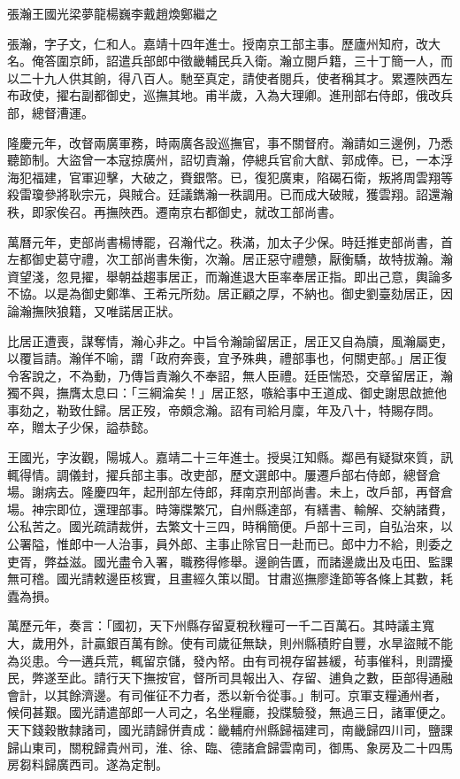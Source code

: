 
\begin{pinyinscope}
張瀚王國光梁夢龍楊巍李戴趙煥鄭繼之

張瀚，字子文，仁和人。嘉靖十四年進士。授南京工部主事。歷廬州知府，改大名。俺答圍京師，詔遣兵部郎中徵畿輔民兵入衛。瀚立閱戶籍，三十丁簡一人，而以二十九人供其餉，得八百人。馳至真定，請使者閱兵，使者稱其才。累遷陜西左布政使，擢右副都御史，巡撫其地。甫半歲，入為大理卿。進刑部右侍郎，俄改兵部，總督漕運。

隆慶元年，改督兩廣軍務，時兩廣各設巡撫官，事不關督府。瀚請如三邊例，乃悉聽節制。大盜曾一本寇掠廣州，詔切責瀚，停總兵官俞大猷、郭成俸。已，一本浮海犯福建，官軍迎擊，大破之，賚銀幣。已，復犯廣東，陷碣石衛，叛將周雲翔等殺雷瓊參將耿宗元，與賊合。廷議鐫瀚一秩調用。已而成大破賊，獲雲翔。詔還瀚秩，即家俟召。再撫陜西。遷南京右都御史，就改工部尚書。

萬曆元年，吏部尚書楊博罷，召瀚代之。秩滿，加太子少保。時廷推吏部尚書，首左都御史葛守禮，次工部尚書朱衡，次瀚。居正惡守禮戇，厭衡驕，故特拔瀚。瀚資望淺，忽見擢，舉朝益趨事居正，而瀚進退大臣率奉居正指。即出己意，輿論多不協。以是為御史鄭準、王希元所劾。居正顧之厚，不納也。御史劉臺劾居正，因論瀚撫陜狼籍，又唯諾居正狀。

比居正遭喪，謀奪情，瀚心非之。中旨令瀚諭留居正，居正又自為牘，風瀚屬吏，以覆旨請。瀚佯不喻，謂「政府奔喪，宜予殊典，禮部事也，何關吏部。」居正復令客說之，不為動，乃傳旨責瀚久不奉詔，無人臣禮。廷臣惴恐，交章留居正，瀚獨不與，撫膺太息曰：「三綱淪矣！」居正怒，嗾給事中王道成、御史謝思啟摭他事劾之，勒致仕歸。居正歿，帝頗念瀚。詔有司給月廩，年及八十，特賜存問。卒，贈太子少保，謚恭懿。

王國光，字汝觀，陽城人。嘉靖二十三年進士。授吳江知縣。鄰邑有疑獄來質，訊輒得情。調儀封，擢兵部主事。改吏部，歷文選郎中。屢遷戶部右侍郎，總督倉場。謝病去。隆慶四年，起刑部左侍郎，拜南京刑部尚書。未上，改戶部，再督倉場。神宗即位，還理部事。時簿牒繁冗，自州縣達部，有繕書、輸解、交納諸費，公私苦之。國光疏請裁併，去繁文十三四，時稱簡便。戶部十三司，自弘治來，以公署隘，惟郎中一人治事，員外郎、主事止除官日一赴而已。郎中力不給，則委之吏胥，弊益滋。國光盡令入署，職務得修舉。邊餉告匱，而諸邊歲出及屯田、監課無可稽。國光請敕邊臣核實，且畫經久策以聞。甘肅巡撫廖逢節等各條上其數，耗蠹為損。

萬歷元年，奏言：「國初，天下州縣存留夏稅秋糧可一千二百萬石。其時議主寬大，歲用外，計贏銀百萬有餘。使有司歲征無缺，則州縣積貯自豐，水旱盜賊不能為災患。今一遘兵荒，輒留京儲，發內帑。由有司視存留甚緩，茍事催科，則謂擾民，弊遂至此。請行天下撫按官，督所司具報出入、存留、逋負之數，臣部得通融會計，以其餘濟邊。有司催征不力者，悉以新令從事。」制可。京軍支糧通州者，候伺甚艱。國光請遣部郎一人司之，名坐糧廳，投牒驗發，無過三日，諸軍便之。天下錢穀散隸諸司，國光請歸併責成：畿輔府州縣歸福建司，南畿歸四川司，鹽課歸山東司，關稅歸貴州司，淮、徐、臨、德諸倉歸雲南司，御馬、象房及二十四馬房芻料歸廣西司。遂為定制。


\end{pinyinscope}
